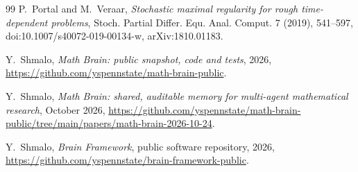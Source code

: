 \documentclass[11pt]{amsart}
\theoremstyle{definition}
\theoremstyle{remark}
\numberwithin{equation}{section}
\begin{document}
\begin{thebibliography}{99}
 P.~Portal and M.~Veraar,
\emph{Stochastic maximal regularity for rough time-dependent problems},
Stoch. Partial Differ. Equ. Anal. Comput. 7 (2019), 541--597,
doi:10.1007/s40072-019-00134-w, arXiv:1810.01183.

 Y.~Shmalo, \emph{Math Brain: public snapshot, code and tests}, 2026, \url{https://github.com/yspennstate/math-brain-public}.

 Y.~Shmalo, \emph{Math Brain: shared, auditable memory for multi-agent mathematical research}, October 2026, \url{https://github.com/yspennstate/math-brain-public/tree/main/papers/math-brain-2026-10-24}.

 Y.~Shmalo, \emph{Brain Framework}, public software repository, 2026, \url{https://github.com/yspennstate/brain-framework-public}.

\end{thebibliography}
\end{document}
